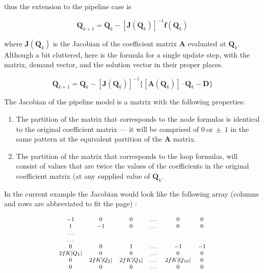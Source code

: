 thus the extension to the pipeline case is

\begin{equation}
\mathbf{Q}_{k+1}=\mathbf{Q}_{k} - [\mathbf{J}(\mathbf{Q}_{k})]^{-1} \mathbf{f}(\mathbf{Q}_k) 
\end{equation}

where
$\mathbf{J}(\mathbf{Q}_{k})$ is the Jacobian of the coefficient matrix $\mathbf{A}$ evaluated at $\mathbf{Q}_{k}$.   Although a bit cluttered, here is the formula for a single update step, with the matrix, demand vector, and the solution vector in their proper places.

\begin{equation}
\mathbf{Q}_{k+1}=\mathbf{Q}_{k} - [\mathbf{J}(\mathbf{Q}_{k})]^{-1} \{[\mathbf{A}(\mathbf{Q}_k)] \cdot \mathbf{Q}_k - \mathbf{D}\}
\end{equation}

The Jacobian of the pipeline model is a matrix with the following properties:
\begin{enumerate}
\item The partition of the matrix that corresponds to the node formulas is identical to the original coefficient matrix --- it will be comprised of $0~\text{or}~\pm~1$ in the same pattern at the equivalent partition of the $\mathbf{A}$ matrix.
\item The partition of the matrix that corresponds to the loop formulas, will consist of values that are twice the values of the coefficients in the original coefficient matrix (at any supplied value of $\mathbf{Q}_k$.
\end{enumerate}

In the current example the Jacobian would look like the following array (columns and rows are abbreviated to fit the page) :

\begin{displaymath}
\footnotesize
\begin{matrix}
-1& 0 & 0  & \dots &0 & 0  \\
 1& -1& 0  & \dots &0 & 0  \\
 \dots \\
\dots \\
0& 0& 1 & \dots  &-1 & -1 \\
2fK|Q_1|& 0& 0 & \dots &0 & 0 \\
0&2 fK|Q_2|& 2fK|Q_3|  & \dots &2fK|Q_{10}| & 0 \\
0& 0& 0 & \dots &0 & 0 \\
 \end{matrix}
 \normalsize
 \end{displaymath}

